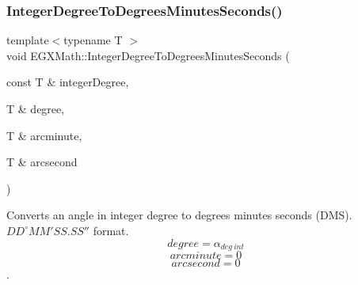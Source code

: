 \subsubsection{\texorpdfstring{Integer\+Degree\+To\+Degrees\+Minutes\+Seconds()}{IntegerDegreeToDegreesMinutesSeconds()}}
{\footnotesize\ttfamily template$<$typename T $>$ \\
void E\+G\+X\+Math\+::\+Integer\+Degree\+To\+Degrees\+Minutes\+Seconds (\begin{DoxyParamCaption}\item[{const T \&}]{integer\+Degree,  }\item[{T \&}]{degree,  }\item[{T \&}]{arcminute,  }\item[{T \&}]{arcsecond }\end{DoxyParamCaption})}



Converts an angle in integer degree to degrees minutes seconds (D\+MS). ${DD}^{\circ}{MM}'{SS.SS}''$ format. \[degree=\alpha_{deg\ int}\] \[arcminute= 0\] \[arcsecond= 0\]. 

